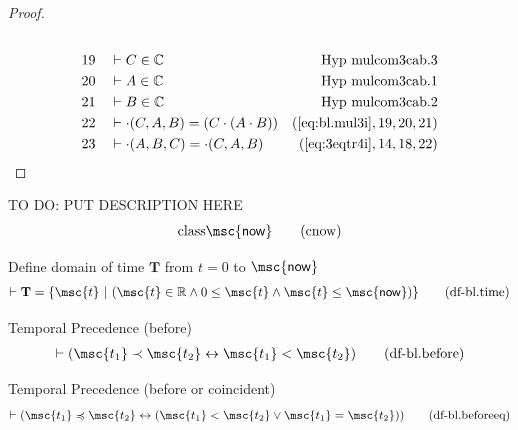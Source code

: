\begin{proof}
\begin{align}
  \\ 19 &&  & \vdash C \in
\mathbb{C}&\text{Hyp~mulcom3cab.3}\notag%
  \\ 20 &&  & \vdash A \in
\mathbb{C}&\text{Hyp~mulcom3cab.1}\notag%
  \\ 21 &&  & \vdash B \in
\mathbb{C}&\text{Hyp~mulcom3cab.2}\notag%
  \\ 22 &&  & \vdash \cdot( C , A , B ) = ( C \cdot ( A \cdot B ) )&(\mbox{\ref{eq:bl.mul3i}},19,20,21)\notag
  \\ 23 &&  & \vdash \cdot( A , B , C ) = \cdot( C , A , B )&(\mbox{\ref{eq:3eqtr4i}},14,18,22)\notag
\end{align}
\end{proof}

\begin{metadefinition} TO DO: PUT DESCRIPTION HERE
\begin{align}
{\rm class} \mathsf{\msc{now}}\label{eq:cnow}\tag{cnow}
\end{align}
\end{metadefinition}

\begin{metadefinition} Define domain of time $\mathbf{T}$
from $t = 0$ to $\mathsf{\msc{now}}$
\begin{align}
\vdash \mathbf{T} = \{ \msc{t}~\vert~( \msc{t} \in \mathbb{R} \wedge 0 \le \msc{t}
    \wedge \msc{t} \le \mathsf{\msc{now}} )
    \}\label{eq:df-bl.time}\tag{df-bl.time}
\end{align}
\end{metadefinition}

\begin{metadefinition} Temporal Precedence (before)
\begin{align}
\vdash ( \msc{t_1} \prec \msc{t_2} \leftrightarrow \msc{t_1} < \msc{t_2}
    )\label{eq:df-bl.before}\tag{df-bl.before}
\end{align}
\end{metadefinition}

\begin{metadefinition} Temporal Precedence (before or
coincident)
\begin{align}
\vdash ( \msc{t_1} \preccurlyeq \msc{t_2} \leftrightarrow ( \msc{t_1} <
    \msc{t_2} \vee \msc{t_1} = \msc{t_2} )
    )\label{eq:df-bl.beforeeq}\tag{df-bl.beforeeq}
\end{align}
\end{metadefinition}

